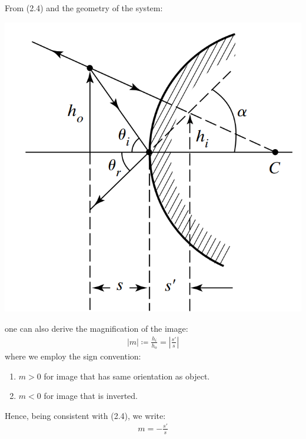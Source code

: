 \documentclass[11pt]{book}
\theoremstyle{break}
\theoremstyle{break}
\begin{document}
From (2.4) and the geometry of the system:
\begin{center}
\includegraphics[scale=0.33]{reflectiveMag.png}
\end{center}
one can also derive the magnification of the image:
\begin{align}
|m| \coloneqq \frac{h_i}{h_o} = \left|\frac{s'}{s}\right|
\end{align}
where we employ the sign convention: \begin{enumerate}[topsep=3pt,itemsep=-1ex,partopsep=1ex,parsep=1ex]
\item $m>0$ for image that has same orientation as object.
\item $m<0$ for image that is inverted.
\end{enumerate}
Hence, being consistent with (2.4), we write:
\begin{align}
m = -\frac{s'}{s}
\end{align}
\end{document}
